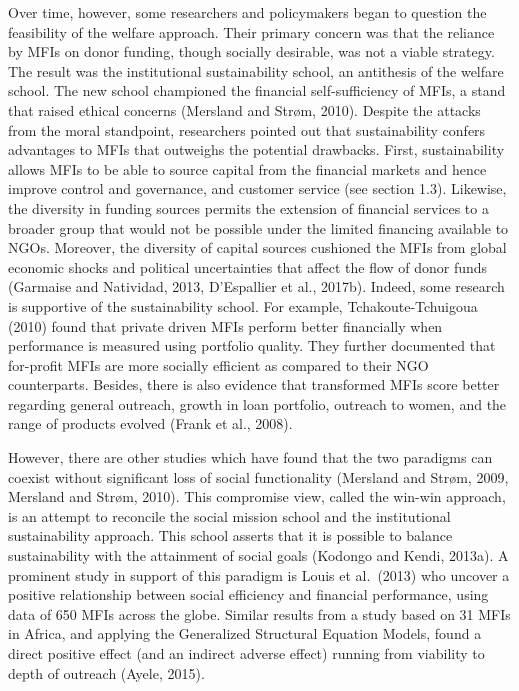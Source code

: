 \documentclass[a4paper, nobind]{templates/ociamthesis}
\begin{document}
Over time, however, some researchers and policymakers began to question the feasibility of the welfare approach. Their primary concern was that the reliance by MFIs on donor funding, though socially desirable, was not a viable strategy. The result was the institutional sustainability school, an antithesis of the welfare school. The new school championed the financial self-sufficiency of MFIs, a stand that raised ethical concerns (Mersland and Strøm, 2010). Despite the attacks from the moral standpoint, researchers pointed out that sustainability confers advantages to MFIs that outweighs the potential drawbacks.
First, sustainability allows MFIs to be able to source capital from the financial markets and hence improve control and governance, and customer service (see section 1.3). Likewise, the diversity in funding sources permits the extension of financial services to a broader group that would not be possible under the limited financing available to NGOs. Moreover, the diversity of capital sources cushioned the MFIs from global economic shocks and political uncertainties that affect the flow of donor funds (Garmaise and Natividad, 2013, D'Espallier et al., 2017b). Indeed, some research is supportive of the sustainability school. For example, Tchakoute-Tchuigoua (2010) found that private driven MFIs perform better financially when performance is measured using portfolio quality. They further documented that for-profit MFIs are more socially efficient as compared to their NGO counterparts. Besides, there is also evidence that transformed MFIs score better regarding general outreach, growth in loan portfolio, outreach to women, and the range of products evolved (Frank et al., 2008).

However, there are other studies which have found that the two paradigms can coexist without significant loss of social functionality (Mersland and Strøm, 2009, Mersland and Strøm, 2010). This compromise view, called the win-win approach, is an attempt to reconcile the social mission school and the institutional sustainability approach. This school asserts that it is possible to balance sustainability with the attainment of social goals (Kodongo and Kendi, 2013a). A prominent study in support of this paradigm is Louis et al.~(2013) who uncover a positive relationship between social efficiency and financial performance, using data of 650 MFIs across the globe. Similar results from a study based on 31 MFIs in Africa, and applying the Generalized Structural Equation Models, found a direct positive effect (and an indirect adverse effect) running from viability to depth of outreach (Ayele, 2015).
\end{document}

